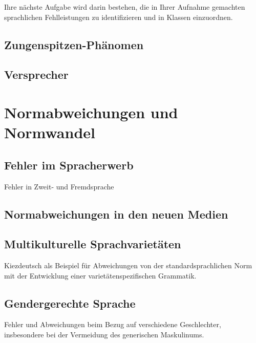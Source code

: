 \documentclass[
  letterpaper,
]{scrbook}
\begin{document}
Ihre nächste Aufgabe wird darin bestehen, die in Ihrer Aufnahme
gemachten sprachlichen Fehlleistungen zu identifizieren und in Klassen
einzuordnen.

\hypertarget{sec-zungenspitze}{%
\chapter{Zungenspitzen-Phänomen}\label{sec-zungenspitze}}

\hypertarget{sec-versprecher}{%
\chapter{Versprecher}\label{sec-versprecher}}

\part{Normabweichungen und Normwandel}

\hypertarget{sec-spracherwerb}{%
\chapter{Fehler im Spracherwerb}\label{sec-spracherwerb}}

Fehler in Zweit- und Fremdsprache

\hypertarget{sec-medien}{%
\chapter{Normabweichungen in den neuen Medien}\label{sec-medien}}

\hypertarget{sec-multikulti}{%
\chapter{Multikulturelle Sprachvarietäten}\label{sec-multikulti}}

Kiezdeutsch als Beispiel für Abweichungen von der standardsprachlichen
Norm mit der Entwicklung einer varietätenspezifischen Grammatik.

\hypertarget{sec-gender}{%
\chapter{Gendergerechte Sprache}\label{sec-gender}}

Fehler und Abweichungen beim Bezug auf verschiedene Geschlechter,
insbesondere bei der Vermeidung des generischen Maskulinums.

\end{document}
